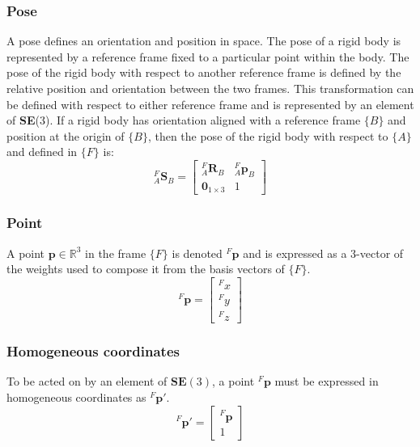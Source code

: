 		\subsubsection{Pose}
		A pose defines an orientation and position in space. The pose of a rigid body is represented by a reference frame fixed to a particular point within the body. The pose of the rigid body with respect to another reference frame is defined by the relative position and orientation between the two frames. This transformation can be defined with respect to either reference frame and is represented by an element of \textbf{SE}(3). If a rigid body has orientation aligned with a reference frame $\{B\}$ and position at the origin of $\{B\}$, then the pose of the rigid body with respect to $\{A\}$ and defined in $\{F\}$ is:
		\begin{equation}
			{^{F}_{A}\mathbf{S}^{}_{B}} = 
			\begin{bmatrix}
				^{F}_{A}\mathbf{R}^{}_{B}	& 	^{F}_{A}\mathbf{p}^{}_{B}\\
				\textbf{0}_{1 \times 3} & 1						  
			\end{bmatrix}
		\end{equation}		
		
		\subsubsection{Point}
		A point $\mathbf{p} \in \mathbb{R}^3$ in the frame $\{F\}$ is denoted $^F\mathbf{p}$ and is expressed as a 3-vector of the weights used to compose it from the basis vectors of $\{F\}$.
		\begin{equation}
			^{F}\mathbf{p} = 
			\begin{bmatrix}
				^{F}x \\
				^{F}y \\
				^{F}z
			\end{bmatrix}
		\end{equation}
		
		\subsubsection{Homogeneous coordinates}
		To be acted on by an element of $\mathbf{SE}(3)$, a point ${^{F}\mathbf{p}}$ must be expressed in homogeneous coordinates as ${^{F}\mathbf{p'}}$.
		\begin{equation}
			^{F}\mathbf{p'} = 
			\begin{bmatrix}
				^{F}\mathbf{p} \\
				1
			\end{bmatrix}
		\end{equation}
		
